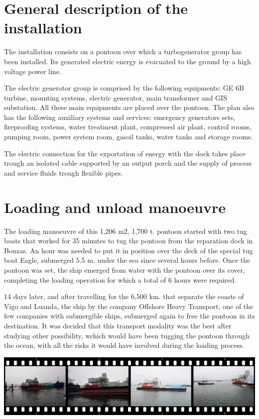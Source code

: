 \begin{minipage}[c]{0.9\linewidth}
\vspace{1cm}  

\section{General description of the installation}
The installation consists on a pontoon over which a turbogenerator
group has been installed. Its generated electric
energy is evacuated to the ground by a high voltage power line.



The electric generator group is comprised by the following
equipments: GE 6B turbine, mounting systems, electric
generator, main transformer and GIS substation. All these main
equipments are placed over the pontoon. The plan also has the
following auxiliary systems and services: emergency
generators sets, fireproofing systems, water treatment plant,
compressed air plant, control rooms, pumping room, power
system room, gasoil tanks, water tanks and storage rooms.



The electric connection for the exportation of energy with the
dock takes place trough an isolated cable supported by an
output porch and the supply of process and service fluids
trough flexible pipes.

\vspace{1cm}  

\section{Loading and unload manoeuvre}

The loading manoeuvre of this 1,206 m2, 1,700 t. pontoon
started with two tug boats that worked for 35 minutes to tug
the pontoon from the reparation dock in Bouzas. An hour was
needed to put it in position over the deck of the special tug
boat Eagle, submerged 5.5 m. under the sea since several hours
before. Once the pontoon was set, the ship emerged from water
with the pontoon over its cover, completing the loading
operation for which a total of 6 hours were required.

14 days later, and after travelling for the 6,500 km. that
separate the coasts of Vigo and Luanda, the ship by the
company Offshore Heavy Transport, one of the few companies
with submergible ships, submerged again to free the pontoon
in its destination. It was decided that this transport modality
was the best after studying other possibility, wchich would
have been tugging the pontoon through the ocean, with all the
risks it would have involved during the loading process.\\

\vspace{1cm}  

\includegraphics[width=\textwidth]{filmHorP2.png}


\end{minipage}
\newpage


